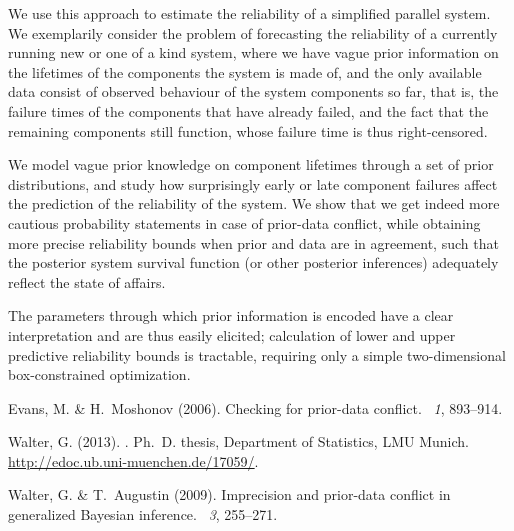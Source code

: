 \documentclass[12pt,a4paper,twocolumn,fleqn]{narmsabs}
\begin{document}
We use this approach to estimate the reliability of a simplified parallel system.
We exemplarily consider the problem of forecasting the reliability of a currently running new or one of a kind system,
where we have vague prior information on the lifetimes of the components the system is made of,
and the only available data consist of observed behaviour of the system components so far,
that is, the failure times of the components that have already failed,
and the fact that the remaining components still function,
whose failure time is thus right-censored.

We model vague prior knowledge on component lifetimes through a set of prior distributions,
and study how surprisingly early or late component failures
affect the prediction of the reliability of the system.
We show that we get indeed more cautious probability statements in case of prior-data conflict,
while obtaining more precise reliability bounds when prior and data are in agreement,
such that the posterior system survival function (or other posterior inferences)
adequately reflect the state of affairs.

The parameters through which prior information is encoded have a clear interpretation
and are thus easily elicited;
calculation of lower and upper predictive reliability bounds is tractable,
requiring only a simple two-dimensional box-constrained optimization.


%
%

\begin{thebibliography}{9}
Evans, M. \& H.~Moshonov (2006).
\newblock Checking for prior-data conflict.
~{\em 1}, 893--914.

Walter, G. (2013).
.
\newblock Ph.\ D. thesis, Department of Statistics, LMU Munich.\\
\url{http://edoc.ub.uni-muenchen.de/17059/}.

Walter, G. \& T.~Augustin (2009).
\newblock Imprecision and prior-data conflict in generalized {B}ayesian
  inference.
~{\em 3}, 255--271.
\end{thebibliography}
\end{document}
